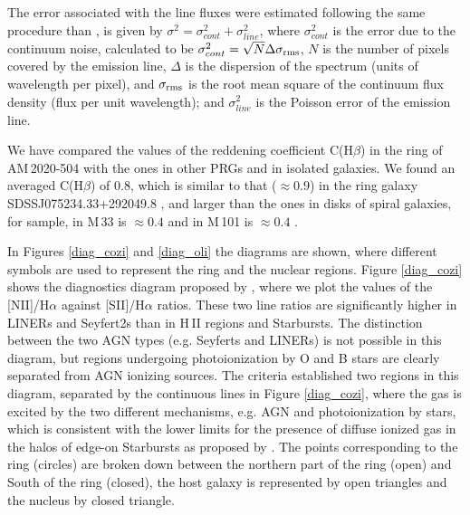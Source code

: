 \documentclass[useAMS,usenatbib]{mn2e}
\begin{document}
The error associated with the line fluxes were estimated following the
same 
procedure than \cite{2008A&A...492..463O}, is given by 
$\sigma^{2}=\sigma^{2}_{cont}+\sigma^{2}_{line}$, 
where  $\sigma^{2}_{cont}$  is the error due to the continuum noise, calculated
to be $\sigma^{2}_{cont}=\sqrt{N}\Delta\sigma_{\rm rms}$,
$N$ is the number of pixels covered
by the emission line, $\Delta$ is the dispersion of the spectrum (units
of wavelength per pixel), and $\sigma_{\rm rms}$ is the root mean square of
the continuum flux density (flux per unit wavelength); and $\sigma^{2}_{line}$
is the Poisson error of the emission line.
 
We have compared the values of the  reddening coefficient C(H$\beta$) in
the ring of \mbox{AM\,2020-504}
with the ones in other PRGs and in isolated galaxies. We found an averaged
C(H$\beta$) of 0.8, which 
is similar to that ($\approx0.9$)  in the ring galaxy 
SDSSJ075234.33+292049.8 \citep{2010MNRAS.401.2067B}, and larger than the ones in  disks
of  
spiral galaxies, for sample, in M\,33 is $\approx0.4$  \citep{2011ApJ...729...56B}
and in M\,101 is $\approx0.4$
\citep{1996ApJ...456..504K}.

In Figures \ref{diag_cozi} and \ref{diag_oli} 
the diagrams are shown, where different symbols are used
to represent the ring and the nuclear regions.
Figure \ref{diag_cozi} shows the diagnostics diagram proposed by
\cite{1999A&A...345..733C}, where we plot the values of the [NII]/H$\alpha$
against [SII]/H$\alpha$ ratios. These two line ratios are significantly higher
in LINERs and Seyfert2s than in H\,II regions and Starbursts. The distinction
between the two AGN types (e.g. Seyferts and LINERs) is not possible  in this
diagram, but regions undergoing photoionization by O and B stars are clearly
separated from AGN ionizing sources. The \cite{1999A&A...345..733C} criteria
established two regions in this diagram, separated by the continuous lines in
Figure \ref{diag_cozi}, where the gas is excited by the two different
mechanisms, e.g. AGN and photoionization by stars, which is consistent with the
lower limits for the presence of diffuse ionized gas in the halos of edge-on
Starbursts as proposed by \cite{1996ApJ...462..651L}. The points corresponding
to the ring (circles) are broken down between the northern part of the ring
(open) and South of the ring (closed), the host galaxy is represented by open
triangles and the nucleus by closed triangle.  
 
\end{document}

